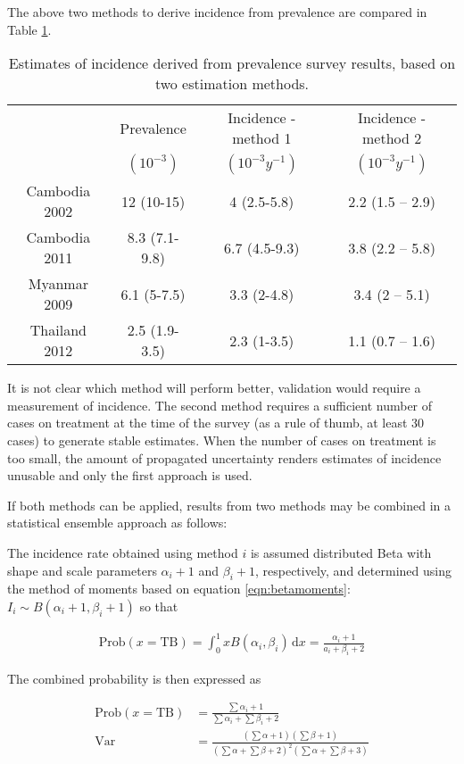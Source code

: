The above two methods to derive incidence from prevalence are compared in Table \ref{tab:2methods}.

\begin{table} 
    \begin{tabular}{ c c c c }
    \hline
         & Prevalence & Incidence - method 1 & Incidence - method 2 \\ 
         & $(10^{-3})$  & $(10^{-3} y^{-1})$     & $(10^{-3} y^{-1})$ \\
    \hline
        Cambodia 2002 & 12 (10-15) & 4 (2.5-5.8) & 2.2 (1.5 – 2.9) \\ 
        Cambodia 2011 & 8.3 (7.1-9.8) & 6.7 (4.5-9.3) & 3.8 (2.2 – 5.8) \\ 
        Myanmar 2009 & 6.1 (5-7.5) & 3.3 (2-4.8) & 3.4 (2 – 5.1) \\ 
        Thailand 2012 & 2.5 (1.9-3.5) & 2.3 (1-3.5) & 1.1 (0.7 – 1.6) \\ 
    \hline
    \end{tabular} 
    \caption{Estimates of incidence derived from prevalence survey results, based on two estimation methods.} 
    \label{tab:2methods}
\end{table}

It is not clear which method will perform better, validation would require a measurement of incidence. The second method requires a sufficient number of cases on treatment at the time of the survey (as a rule of thumb, at least 30 cases) to generate stable estimates. When the number of cases on treatment is too small, the amount of propagated uncertainty renders estimates of incidence unusable and only the first approach is used. 

If both methods can be applied, results from two methods may be combined in a statistical ensemble approach as follows:

The incidence rate obtained using method $i$ is assumed distributed Beta with shape and scale parameters $\alpha_i + 1$ and $\beta_i + 1$, respectively, and determined using the method of moments based on equation \ref{eqn:betamoments}: $I_i \sim B\left(\alpha_i + 1, \beta_i + 1\right)$ so that 

\begin{align*}
\textrm{Prob}(x = \textrm{TB})= \int_{0}^{1} x B(\alpha_i, \beta_i)\, \mathrm{d}x = \frac{\alpha_i+1}{a_i+\beta_i+2}
\end{align*}

The combined probability is then expressed as 

\begin{align*}
\textrm{Prob}(x = \textrm{TB}) &= \frac{\sum{\alpha_i}+1}{\sum{\alpha_i}+\sum{\beta_i}+2} \\
\textrm{Var} &= \frac{\left(\sum{\alpha} +1\right)\left(\sum{\beta} +1\right)}{\left(\sum{\alpha} + \sum{\beta} + 2\right)^2 \left(\sum{\alpha} + \sum{\beta} + 3\right)}
\end{align*}


